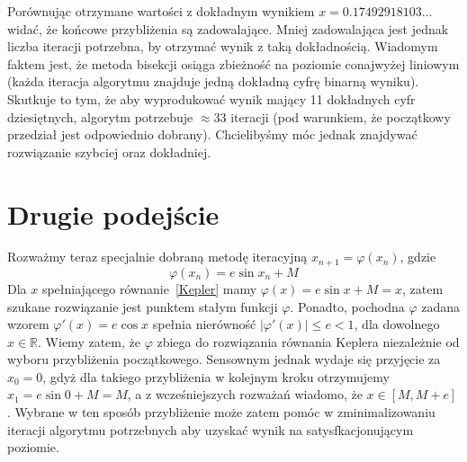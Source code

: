 \documentclass[11pt,wide,leqno]{article}
\begin{document}
        Porównując otrzymane wartości z dokładnym wynikiem 
        \(x = 0.17492918103\ldots\) widać, że końcowe przybliżenia są 
        zadowalające. Mniej zadowalająca jest jednak liczba iteracji potrzebna, by
        otrzymać wynik z taką dokładnością. Wiadomym faktem jest, że metoda bisekcji
        osiąga zbieżność na poziomie conajwyżej liniowym (każda iteracja algorytmu 
        znajduje jedną dokładną cyfrę binarną wyniku). Skutkuje to tym, że aby wyprodukować
        wynik mający 11 dokładnych cyfr dziesiętnych, algorytm potrzebuje \(\approx 33\) iteracji (pod warunkiem, że początkowy przedział jest odpowiednio dobrany).
        Chcielibyśmy móc jednak znajdywać rozwiązanie szybciej oraz dokładniej.

    \section{Drugie podejście}\label{iter}
        Rozważmy teraz specjalnie dobraną metodę iteracyjną
        \(x_{n+1} = \varphi(x_n)\), gdzie
        \begin{equation}\label{phi}
            \varphi(x_n) = e\sin x_n + M
        \end{equation}
        Dla \(x\) spełniającego równanie~\eqref{Kepler} mamy
        \(\varphi(x) = e\sin x + M = x\), zatem szukane rozwiązanie jest punktem
        stałym funkcji \(\varphi\). Ponadto, pochodna \(\varphi\) 
        zadana wzorem \(\varphi'(x) = e\cos x\) spełnia nierówność
        \(|\varphi'(x)| \leq e < 1\), dla dowolnego \(x \in \mathbb{R}\).
        Wiemy zatem, że \(\varphi\) zbiega do rozwiązania równania Keplera niezależnie od
        wyboru przybliżenia początkowego. Sensownym jednak wydaje się przyjęcie za
        \(x_0 = 0\), gdyż dla takiego przybliżenia w kolejnym kroku otrzymujemy
        \(x_1 = e\sin 0 + M = M\), a z wcześniejszych rozważań wiadomo, że
        \(x \in \left[M, M + e\right]\). Wybrane w ten sposób
        przybliżenie może zatem pomóc w zminimalizowaniu iteracji algorytmu potrzebnych aby uzyskać
        wynik na satysfkacjonującym poziomie.
\end{document}

